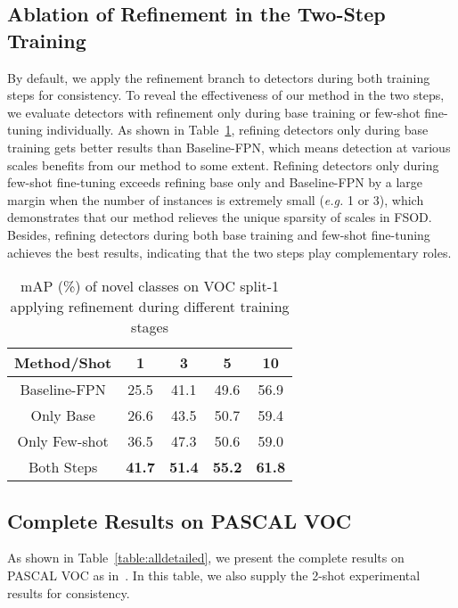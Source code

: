 \documentclass[runningheads]{llncs}
\begin{document}
\subsection{Ablation of Refinement in the Two-Step Training}
By default, we apply the refinement branch to detectors during both training steps for consistency.
To reveal the effectiveness of our method in the two steps, we evaluate detectors with refinement only during base training or few-shot fine-tuning individually.
As shown in Table~\ref{table:baseandfewrefine}, refining detectors only during base training gets better results than Baseline-FPN, which means detection at various scales benefits from our method to some extent.
Refining detectors only during few-shot fine-tuning exceeds refining base only and Baseline-FPN by a large margin when the number of instances is extremely small (\emph{e.g.} 1 or 3), which demonstrates that our method relieves the unique sparsity of scales in FSOD.
Besides, refining detectors during both base training and few-shot fine-tuning achieves the best results, indicating that the two steps play complementary roles.

\setlength{\tabcolsep}{5pt}
\begin{table}
	\begin{center}
		\caption{mAP (\%) of novel classes on VOC split-1 applying refinement during different training stages}
		\label{table:baseandfewrefine}
		\begin{tabular}{c|cccc}
			\hline
			Method/Shot & 1 & 3 & 5 & 10 \\ \hline
			Baseline-FPN & 25.5 & 41.1 & 49.6 & 56.9 \\
			Only Base & 26.6 & 43.5 & 50.7 & 59.4 \\
			Only Few-shot & 36.5 & 47.3 & 50.6 & 59.0 \\
			Both Steps & \textbf{41.7} & \textbf{51.4} & \textbf{55.2} & \textbf{61.8} \\ \hline
		\end{tabular}
	\end{center}
\end{table}
\setlength{\tabcolsep}{1.4pt}

\subsection{Complete Results on PASCAL VOC}
As shown in Table~\ref{table:alldetailed}, we present the complete results on PASCAL VOC as in~\cite{metarcnn}. In this table, we also supply the 2-shot experimental results for consistency.
\end{document}
